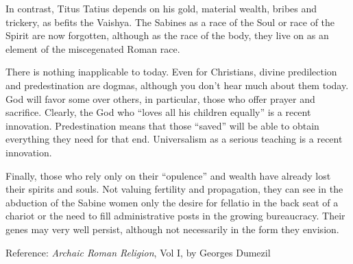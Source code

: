 In contrast, Titus Tatius depends on his gold, material wealth, bribes and trickery, as befits the Vaishya. The Sabines as a race of the Soul or race of the Spirit are now forgotten, although as the race of the body, they live on as an element of the miscegenated Roman race.

There is nothing inapplicable to today. Even for Christians, divine predilection and predestination are dogmas, although you don't hear much about them today. God will favor some over others, in particular, those who offer prayer and sacrifice. Clearly, the God who ``loves all his children equally'' is a recent innovation. Predestination means that those ``saved'' will be able to obtain everything they need for that end. Universalism as a serious teaching is a recent innovation.

Finally, those who rely only on their ``opulence'' and wealth have already lost their spirits and souls. Not valuing fertility and propagation, they can see in the abduction of the Sabine women only the desire for fellatio in the back seat of a chariot or the need to fill administrative posts in the growing bureaucracy. Their genes may very well persist, although not necessarily in the form they envision.

Reference: \emph{Archaic Roman Religion}, Vol I, by Georges Dumezil



